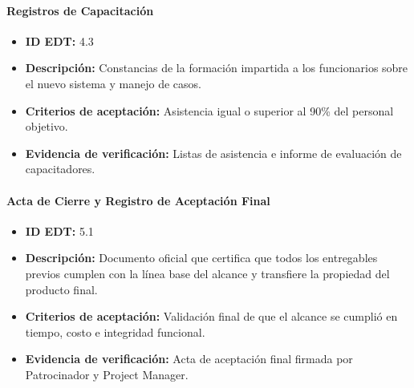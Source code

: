 \paragraph{Registros de Capacitación}
\begin{itemize}
    \item \textbf{ID EDT:} 4.3
    \item \textbf{Descripción:} Constancias de la formación impartida a los funcionarios sobre el nuevo sistema y manejo de casos.
    \item \textbf{Criterios de aceptación:} Asistencia igual o superior al 90\% del personal objetivo.
    \item \textbf{Evidencia de verificación:} Listas de asistencia e informe de evaluación de capacitadores.
\end{itemize}

\paragraph{Acta de Cierre y Registro de Aceptación Final}
\begin{itemize}
    \item \textbf{ID EDT:} 5.1
    \item \textbf{Descripción:} Documento oficial que certifica que todos los entregables previos cumplen con la línea base del alcance y transfiere la propiedad del producto final.
    \item \textbf{Criterios de aceptación:} Validación final de que el alcance se cumplió en tiempo, costo e integridad funcional.
    \item \textbf{Evidencia de verificación:} Acta de aceptación final firmada por Patrocinador y Project Manager.
\end{itemize}